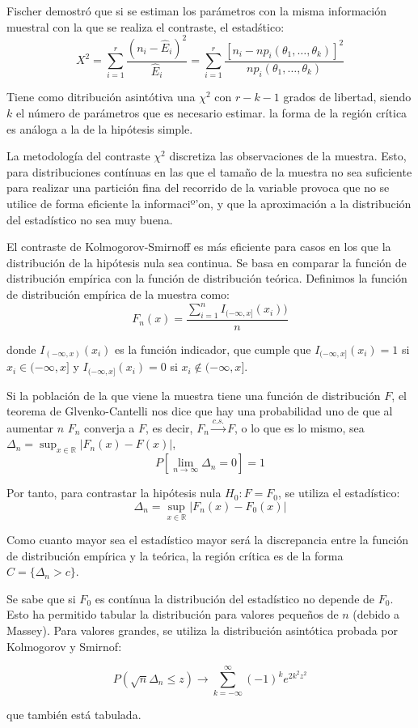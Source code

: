 Fischer demostr\'o que si se estiman los par\'ametros con la misma informaci\'on muestral con la que se realiza el contraste, el estad\'stico:
\[X^2=\sum_{i=1}^r\dfrac{(n_i-\hat{E}_i)^2}{\hat{E}_i}=\sum_{i=1}^r\dfrac{[n_i-np_i(\theta_1,\ldots,\theta_k)]^2}{np_i(\theta_1,\ldots,\theta_k)}\]

Tiene como ditribuci\'on asint\'otiva una $\chi^2$ con $r-k-1$ grados de libertad, siendo $k$ el n\'umero de par\'ametros que es necesario estimar. la forma de la regi\'on cr\'itica es an\'aloga a la de la hip\'otesis simple.


La metodolog\'ia del contraste $\chi^2$ discretiza las observaciones de la muestra. Esto, para distribuciones cont\'inuas en las que el tama\~no de la muestra no sea suficiente para realizar una partici\'on fina del recorrido de la variable provoca que no se utilice de forma eficiente la informaciº'on, y que la aproximaci\'on a la distribuci\'on del estad\'istico no sea muy buena.

El contraste de Kolmogorov-Smirnoff es m\'as eficiente para casos en los que la distribuci\'on de la hip\'otesis nula sea continua. Se basa en comparar la funci\'on de distribuci\'on emp\'irica con la funci\'on de distribuci\'on te\'orica. Definimos la funci\'on de distribuci\'on emp\'irica de la muestra como:
\[F_n(x)=\dfrac{\sum_{i=1}^nI_{(-\infty,x]}(x_i))}{n}\]

donde $I_{(-\infty,x)}(x_i)$ es la funci\'on indicador, que cumple que $I_{(-\infty,x]}(x_i)=1$ si $x_i\in(-\infty,x]$ y $I_{(-\infty,x]}(x_i)=0$ si $x_i\notin(-\infty,x]$.

Si la poblaci\'on de la que viene la muestra tiene una funci\'on de distribuci\'on $F$, el teorema de Glvenko-Cantelli nos dice que hay una probabilidad uno de que al aumentar $n$ $F_n$ converja a $F$, es decir, $F_n\overset{c.s.}{\to}F$, o lo que es lo mismo, sea $\Delta_n=\sup_{x\in\mathbb{R}}|F_n(x)-F(x)|$,
\[P\left[\lim_{n\to\infty}\Delta_n=0\right]=1\]

Por tanto, para contrastar la hip\'otesis nula $H_0:F=F_0$, se utiliza el estad\'istico:
\[\Delta_n=\sup_{x\in\mathbb{R}}|F_n(x)-F_0(x)|\]

Como cuanto mayor sea el estad\'istico mayor ser\'a la discrepancia entre la funci\'on de distribuci\'on emp\'irica y la te\'orica, la regi\'on cr\'itica es de la forma $C=\{\Delta_n>c\}$.

Se sabe que si $F_0$ es cont\'inua la distribuci\'on del estad\'istico no depende de $F_0$. Esto ha permitido tabular la distribuci\'on para valores peque\~nos de $n$ (debido a Massey). Para valores grandes, se utiliza la distribuci\'on asint\'otica probada por Kolmogorov y Smirnof:

\[P\left(\sqrt{n}\Delta_n\leq z\right)\to\sum_{k=-\infty}^{\infty}(-1)^ke^{2k^2z^2}\]

que tambi\'en est\'a tabulada.
